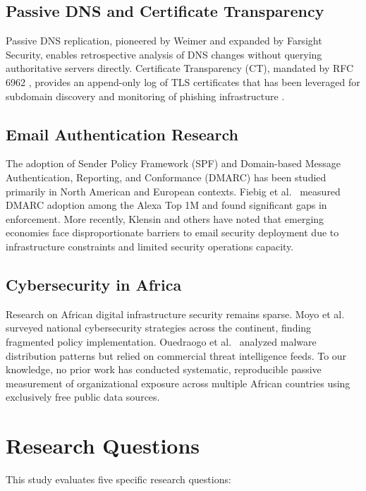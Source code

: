 \documentclass[conference]{IEEEtran}
\begin{document}
\subsection{Passive DNS and Certificate Transparency}
Passive DNS replication, pioneered by Weimer \cite{weimer2005passive} and expanded by Farsight Security, enables retrospective analysis of DNS changes without querying authoritative servers directly. Certificate Transparency (CT), mandated by RFC 6962 \cite{rfc6962}, provides an append-only log of TLS certificates that has been leveraged for subdomain discovery \cite{thomas2016transparency} and monitoring of phishing infrastructure \cite{syverson2018certified}.

\subsection{Email Authentication Research}
The adoption of Sender Policy Framework (SPF) \cite{rfc7208} and Domain-based Message Authentication, Reporting, and Conformance (DMARC) \cite{rfc7489} has been studied primarily in North American and European contexts. Fiebig et al.\ \cite{fiebig2018} measured DMARC adoption among the Alexa Top 1M and found significant gaps in enforcement. More recently, Klensin \cite{klensin2019} and others have noted that emerging economies face disproportionate barriers to email security deployment due to infrastructure constraints and limited security operations capacity.

\subsection{Cybersecurity in Africa}
Research on African digital infrastructure security remains sparse. Moyo et al.\ \cite{moyo2020africa} surveyed national cybersecurity strategies across the continent, finding fragmented policy implementation. Ouedraogo et al.\ \cite{ouedraogo2021threats} analyzed malware distribution patterns but relied on commercial threat intelligence feeds. To our knowledge, no prior work has conducted systematic, reproducible passive measurement of organizational exposure across multiple African countries using exclusively free public data sources.

\section{Research Questions}

This study evaluates five specific research questions:
\end{document}
